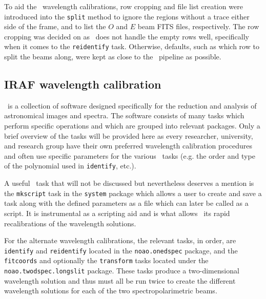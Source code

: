 To aid the \iraf\ wavelength calibrations, row cropping and file list creation were introduced into the \texttt{split} method to ignore the regions without a trace either side of the frame, and to list the $O$ and $E$ beam \gls{FITS} files, respectively. The row cropping was decided on as \iraf\ does not handle the empty rows well, specifically when it comes to the \texttt{reidentify} task. Otherwise, defaults, such as which row to split the beams along, were kept as close to the \polsalt\ pipeline as possible.


\subsection{IRAF wavelength calibration}\label{subsec:IRAF_wav_cal}

\iraf\ is a collection of software designed specifically for the reduction and analysis of astronomical images and spectra. The software consists of many tasks which perform specific operations and which are grouped into relevant packages. Only a brief overview of the tasks will be provided here as every researcher, university, and research group have their own preferred wavelength calibration procedures and often use specific parameters for the various \iraf\ tasks (e.g. the order and type of the polynomial used in \texttt{identify}, etc.).
\prgph

A useful \iraf\ task that will not be discussed but nevertheless deserves a mention is the \texttt{mkscript} task in the \texttt{system} package which allows a user to create and save a task along with the defined parameters as a file which can later be called as a script. It is instrumental as a scripting aid and is what allows \iraf\ its rapid recalibrations of the wavelength solutions.
\prgph

For the alternate wavelength calibrations, the relevant tasks, in order, are \texttt{identify} and \texttt{reidentify} located in the \texttt{noao.onedspec} package, and the \texttt{fitcoords} and optionally the \texttt{transform} tasks located under the \texttt{noao.twodspec.longslit} package. These tasks produce a two-dimensional wavelength solution and thus must all be run twice to create the different wavelength solutions for each of the two spectropolarimetric beams.

